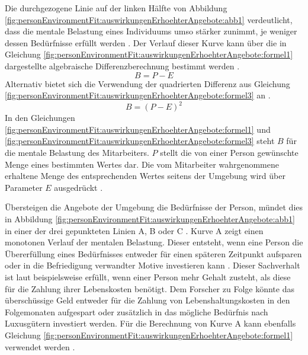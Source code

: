 Die durchgezogene Linie auf der linken Hälfte von Abbildung \ref{fig:personEnvironmentFit:auswirkungenErhoehterAngebote:abb1} verdeutlicht, dass die mentale Belastung eines Individuums umso stärker zunimmt, je weniger dessen Bedürfnisse erfüllt werden \cite[S. 30]{mechanismsOfJobStressAndStrain:1982}. Der Verlauf dieser Kurve kann über die in Gleichung \ref{fig:personEnvironmentFit:auswirkungenErhoehterAngebote:formel1} dargestellte algebraische Differenzberechnung bestimmt werden \cite[S. 2]{edwards:1993}.
\begin{equation}
	B = P - E
	\label{fig:personEnvironmentFit:auswirkungenErhoehterAngebote:formel1}
\end{equation}
Alternativ bietet sich die Verwendung der quadrierten Differenz aus Gleichung \ref{fig:personEnvironmentFit:auswirkungenErhoehterAngebote:formel3} an \cite[S. 2]{edwards:1993}.
\begin{equation}
	B = (P - E)^2
	\label{fig:personEnvironmentFit:auswirkungenErhoehterAngebote:formel3}
\end{equation}
In den Gleichungen \ref{fig:personEnvironmentFit:auswirkungenErhoehterAngebote:formel1} und \ref{fig:personEnvironmentFit:auswirkungenErhoehterAngebote:formel3} steht $B$ für die mentale Belastung des Mitarbeiters. $P$ stellt die von einer Person gewünschte Menge eines bestimmten Wertes dar. Die vom Mitarbeiter wahrgenommene erhaltene Menge des entsprechenden Wertes seitens der Umgebung wird über Parameter $E$ ausgedrückt \cite[S. 1f.]{edwards:1993}.

Übersteigen die Angebote der Umgebung die Bedürfnisse der Person, mündet dies in Abbildung \ref{fig:personEnvironmentFit:auswirkungenErhoehterAngebote:abb1} in einer der drei gepunkteten Linien A, B oder C \cite[S. 29ff.]{mechanismsOfJobStressAndStrain:1982}. Kurve A zeigt einen monotonen Verlauf der mentalen Belastung. Dieser entsteht, wenn eine Person die Übererfüllung eines Bedürfnisses entweder für einen späteren Zeitpunkt aufsparen oder in die Befriedigung verwandter Motive investieren kann \cite[S. 21]{edwards:2008}\cite[S. 30]{mechanismsOfJobStressAndStrain:1982}\cite[S. 11]{harrison:1978}. Dieser Sachverhalt ist laut \textcite[S. 21]{edwards:2008} beispielsweise erfüllt, wenn einer Person mehr Gehalt zusteht, als diese für die Zahlung ihrer Lebenskosten benötigt. Dem Forscher zu Folge könnte das überschüssige Geld entweder für die Zahlung von Lebenshaltungskosten in den Folgemonaten aufgespart oder zusätzlich in das mögliche Bedürfnis nach Luxusgütern investiert werden. Für die Berechnung von Kurve A kann ebenfalls Gleichung \ref{fig:personEnvironmentFit:auswirkungenErhoehterAngebote:formel1} verwendet werden \cite[S. 2]{edwards:1993}.

